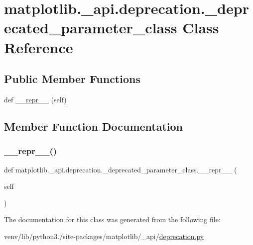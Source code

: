 \hypertarget{classmatplotlib_1_1__api_1_1deprecation_1_1__deprecated__parameter__class}{}\section{matplotlib.\+\_\+api.\+deprecation.\+\_\+deprecated\+\_\+parameter\+\_\+class Class Reference}
\label{classmatplotlib_1_1__api_1_1deprecation_1_1__deprecated__parameter__class}
\subsection*{Public Member Functions}
\begin{DoxyCompactItemize}
\item 
def \hyperlink{classmatplotlib_1_1__api_1_1deprecation_1_1__deprecated__parameter__class_aea11f89b972d64947b39c43c331fa233}{\+\_\+\+\_\+repr\+\_\+\+\_\+} (self)
\end{DoxyCompactItemize}


\subsection{Member Function Documentation}
\mbox{\label{classmatplotlib_1_1__api_1_1deprecation_1_1__deprecated__parameter__class_aea11f89b972d64947b39c43c331fa233}} 
\subsubsection{\texorpdfstring{\+\_\+\+\_\+repr\+\_\+\+\_\+()}{\_\_repr\_\_()}}
{\footnotesize\ttfamily def matplotlib.\+\_\+api.\+deprecation.\+\_\+deprecated\+\_\+parameter\+\_\+class.\+\_\+\+\_\+repr\+\_\+\+\_\+ (\begin{DoxyParamCaption}\item[{}]{self }\end{DoxyParamCaption})}



The documentation for this class was generated from the following file\+:\begin{DoxyCompactItemize}
\item 
venv/lib/python3./site-\/packages/matplotlib/\+\_\+api/\hyperlink{matplotlib_2__api_2deprecation_8py}{deprecation.\+py}\end{DoxyCompactItemize}
